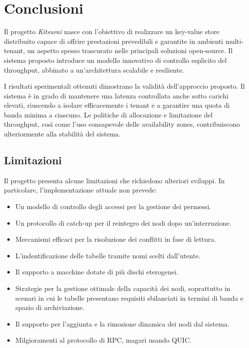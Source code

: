 \section{Conclusioni}
\label{sec:conclusioni}


Il progetto \textit{Kitsurai} nasce con l'obiettivo di realizzare un key-value store distribuito capace di offrire prestazioni prevedibili e garantite in ambienti multi-tenant, un aspetto spesso trascurato nelle principali soluzioni open-source. Il sistema proposto introduce un modello innovativo di controllo esplicito del throughput, abbinato a un'architettura scalabile e resiliente.

I risultati sperimentali ottenuti dimostrano la validità dell'approccio proposto. Il sistema è in grado di mantenere una latenza controllata anche sotto carichi elevati, riuscendo a isolare efficacemente i tenant e a garantire una quota di banda minima a ciascuno. Le politiche di allocazione e limitazione del throughput, così come l'uso consapevole delle availability zones, contribuiscono ulteriormente alla stabilità del sistema.

\subsection{Limitazioni}
\label{subsec:limitazioni}

Il progetto presenta alcune limitazioni che richiedono ulteriori sviluppi.
In particolare, l'implementazione attuale non prevede:

\begin{itemize}
    \item Un modello di controllo degli accessi per la gestione dei permessi.
    \item Un protocollo di catch-up per il reintegro dei nodi dopo un'interruzione.
    \item Meccanismi efficaci per la risoluzione dei conflitti in fase di lettura.
    \item L'indentificazione delle tabelle tramite nomi scelti dall'utente.
    \item Il supporto a macchine dotate di più dischi eterogenei.
    \item Strategie per la gestione ottimale della capacità dei nodi, soprattutto in scenari in cui le tabelle presentano requisiti sbilanciati in termini di banda e spazio di archiviazione.
    \item Il supporto per l'aggiunta e la rimozione dinamica dei nodi dal sistema.
    \item Milgioramenti al protocollo di RPC, magari usando QUIC\cite{QUIC}.
\end{itemize}
